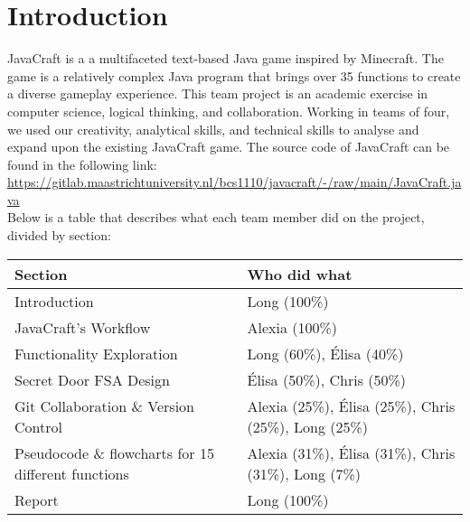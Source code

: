\section{Introduction} \label{section: introduction}
JavaCraft is a a multifaceted text-based Java game inspired by Minecraft. The game is a relatively complex Java program that brings over 35 functions to create a diverse gameplay experience. This team project is an academic exercise in computer science, logical thinking, and collaboration. Working in teams of four, we used our creativity, analytical skills, and technical skills to analyse and expand upon the existing JavaCraft game. The source code of JavaCraft can be found in the following link: \url{https://gitlab.maastrichtuniversity.nl/bcs1110/javacraft/-/raw/main/JavaCraft.java} \\

Below is a table that describes what each team member did on the project, divided by section:

\begin{center}
    \begin{tabular}{ l l }
     Section & Who did what\\
     \hline
     Introduction & Long (100\%)\\  
     JavaCraft's Workflow & Alexia (100\%) \\
     Functionality Exploration & Long (60\%), Élisa (40\%) \\
     Secret Door FSA Design & Élisa (50\%), Chris (50\%) \\
     Git Collaboration \& Version Control & Alexia (25\%), Élisa (25\%), Chris (25\%), Long (25\%) \\
     Pseudocode \& flowcharts for 15 different functions & Alexia (31\%), Élisa (31\%), Chris (31\%), Long (7\%) \\
     Report & Long (100\%) \\ 
    \end{tabular}
\end{center}
